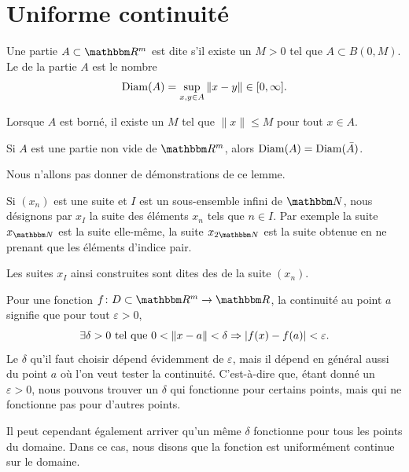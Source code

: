 \section{Uniforme continuité}		\label{SecUnifContinue}

\begin{definition}
	Une partie $A\subset\eR^m$ est dite  s'il existe un $M>0$ tel que $A\subset B(0,M)$. Le  de la partie $A$ est le nombre
	\begin{equation}
		\operatorname{Diam}(A)=\sup_{x,y\in A}\| x-y \|\in\mathopen[ 0 , \infty \mathclose].
	\end{equation}
\end{definition}
Lorsque $A$ est borné, il existe un $M$ tel que $\| x \|\leq M$ pour tout $x\in A$.

\begin{lemma}
	Si $A$ est une partie non vide de $\eR^m$, alors $\operatorname{Diam}(A)=\operatorname{Diam}(\bar A)$.
\end{lemma}
Nous n'allons pas donner de démonstrations de ce lemme.


Si $(x_n)$ est une suite et $I$ est un sous-ensemble infini de $\eN$, nous désignons par $x_I$ la suite des éléments $x_n$ tels que $n\in I$. Par exemple la suite $x_{\eN}$ est la suite elle-même, la suite $x_{2\eN}$ est la suite obtenue en ne prenant que les éléments d'indice pair.

Les suites $x_I$ ainsi construites sont dites des  de la suite $(x_n)$.


Pour une fonction $f\colon D\subset\eR^m\to \eR$, la continuité au point $a$ signifie que pour tout $\varepsilon>0$,
\begin{equation}
	\exists\delta>0\text{ tel que } 0<\| x-a \|<\delta\Rightarrow | f(x)-f(a) |<\varepsilon.
\end{equation}
Le $\delta$ qu'il faut choisir dépend évidemment de $\varepsilon$, mais il dépend en général aussi du point $a$ où l'on veut tester la continuité. C'est-à-dire que, étant donné un $\varepsilon>0$, nous pouvons trouver un $\delta$ qui fonctionne pour certains points, mais qui ne fonctionne pas pour d'autres points.

Il peut cependant également arriver qu'un même $\delta$ fonctionne pour tous les points du domaine. Dans ce cas, nous disons que la fonction est uniformément continue sur le domaine.

